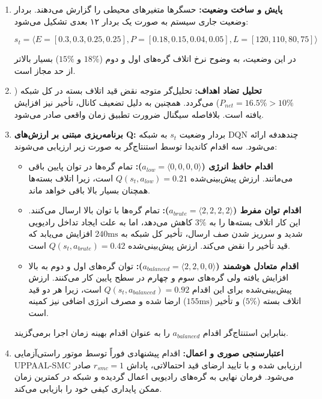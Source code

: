 \documentclass[oneside,openany,phd]{TMU-Thesis}
\begin{document}
\begin{enumerate}

\item \textbf{پایش و ساخت وضعیت:} حسگرها متغیرهای محیطی را گزارش می‌دهند. بردار وضعیت جاری سیستم به صورت یک بردار ۱۲ بعدی تشکیل می‌شود:

$$s_t = \langle E=[0.3, 0.3, 0.25, 0.25], P=[0.18, 0.15, 0.04, 0.05], L=[120, 110, 80, 75] \rangle$$

در این وضعیت، به وضوح نرخ اتلاف گره‌های اول و دوم ($18\%$ و $15\%$) بسیار بالاتر از حد مجاز است.

\item \textbf{تحلیل تضاد اهداف:} تحلیل‌گر متوجه نقض قید اتلاف بسته در کل شبکه ($P_{net} = 16.5\% > 10\%$) می‌گردد. همچنین به دلیل تضعیف کانال، تأخیر نیز افزایش یافته است. بلافاصله سیگنال ضرورت تطبیق زمان واقعی صادر می‌شود.

\item \textbf{برنامه‌ریزی مبتنی بر ارزش‌های Q:} بردار وضعیت $s_t$ به شبکه DQN چندهدفه ارائه می‌شود. سه اقدام کاندیدا توسط استنتاج‌گر به صورت زیر ارزیابی می‌شوند:

\begin{itemize}

\item \textbf{اقدام حافظ انرژی ($a_{low} = \langle 0, 0, 0, 0 \rangle$):} تمام گره‌ها در توان پایین باقی می‌مانند. ارزش پیش‌بینی‌شده $Q(s_t, a_{low}) = 0.21$ است، زیرا اتلاف بسته‌ها همچنان بسیار بالا باقی خواهد ماند.

\item \textbf{اقدام توان مفرط ($a_{brute} = \langle 2, 2, 2, 2 \rangle$):} تمام گره‌ها با توان بالا ارسال می‌کنند. این کار اتلاف بسته‌ها را به $3\%$ کاهش می‌دهد، اما به علت ایجاد تداخل رادیویی شدید و سرریز شدن صف ارسال، تأخیر کل شبکه به $240\text{ms}$ افزایش می‌یابد که قید تأخیر را نقض می‌کند. ارزش پیش‌بینی‌شده $Q(s_t, a_{brute}) = 0.42$ است.

\item \textbf{اقدام متعادل هوشمند ($a_{balanced} = \langle 2, 2, 0, 0 \rangle$):} توان گره‌های اول و دوم به بالا افزایش یافته ولی گره‌های سوم و چهارم در سطح پایین کار می‌کنند. ارزش پیش‌بینی‌شده برای این اقدام $Q(s_t, a_{balanced}) = 0.92$ است، زیرا هر دو قید اتلاف بسته ($5\%$) و تأخیر ($155\text{ms}$) ارضا شده و مصرف انرژی اضافی نیز کمینه است.

\end{itemize}

بنابراین استنتاج‌گر اقدام $a_{balanced}$ را به عنوان اقدام بهینه زمان اجرا برمی‌گزیند.

\item \textbf{اعتبارسنجی صوری و اعمال:} اقدام پیشنهادی فوراً توسط موتور راستی‌آزمایی UPPAAL-SMC ارزیابی شده و با تایید ارضای قید احتمالاتی، پاداش $r_{smc}=1$ صادر می‌شود. فرمان نهایی به گره‌های رادیویی اعمال گردیده و شبکه در کمترین زمان ممکن پایداری کیفی خود را بازیابی می‌کند.

\end{enumerate}
\end{document}
